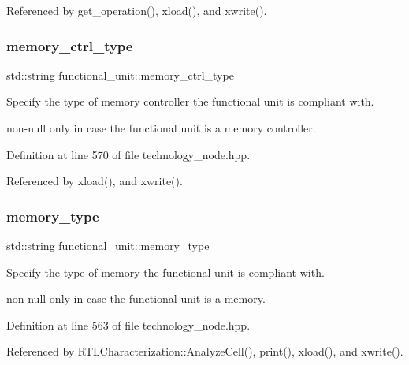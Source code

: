 Referenced by get\+\_\+operation(), xload(), and xwrite().

\mbox{\label{structfunctional__unit_aa76dd27e7dc1c9f5a210e3ee31192447}} 
\subsubsection{\texorpdfstring{memory\+\_\+ctrl\+\_\+type}{memory\_ctrl\_type}}
{\footnotesize\ttfamily std\+::string functional\+\_\+unit\+::memory\+\_\+ctrl\+\_\+type}



Specify the type of memory controller the functional unit is compliant with. 

non-\/null only in case the functional unit is a memory controller. 

Definition at line 570 of file technology\+\_\+node.\+hpp.



Referenced by xload(), and xwrite().

\mbox{\label{structfunctional__unit_a9a31e3517578bf183d48e6a341676392}} 
\subsubsection{\texorpdfstring{memory\+\_\+type}{memory\_type}}
{\footnotesize\ttfamily std\+::string functional\+\_\+unit\+::memory\+\_\+type}



Specify the type of memory the functional unit is compliant with. 

non-\/null only in case the functional unit is a memory. 

Definition at line 563 of file technology\+\_\+node.\+hpp.



Referenced by R\+T\+L\+Characterization\+::\+Analyze\+Cell(), print(), xload(), and xwrite().

\mbox{\label{structfunctional__unit_a57eafba98fafceb48f796b519aa75e52}} 

